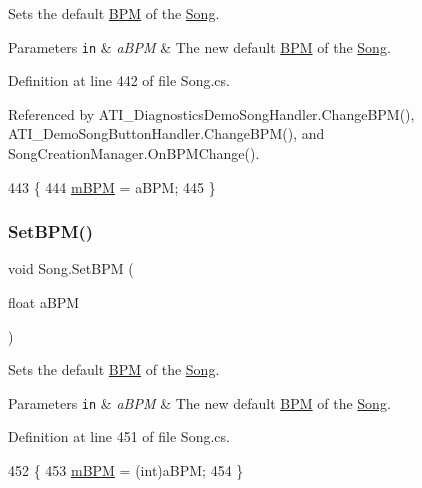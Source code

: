 Sets the default \hyperlink{group___audio_DefBPM}{B\+PM} of the \hyperlink{class_song}{Song}. 


\begin{DoxyParams}[1]{Parameters}
\mbox{\tt in}  & {\em a\+B\+PM} & The new default \hyperlink{group___audio_DefBPM}{B\+PM} of the \hyperlink{class_song}{Song}. \\
\hline
\end{DoxyParams}


Definition at line 442 of file Song.\+cs.



Referenced by A\+T\+I\+\_\+\+Diagnostics\+Demo\+Song\+Handler.\+Change\+B\+P\+M(), A\+T\+I\+\_\+\+Demo\+Song\+Button\+Handler.\+Change\+B\+P\+M(), and Song\+Creation\+Manager.\+On\+B\+P\+M\+Change().


\begin{DoxyCode}
443     \{
444         \hyperlink{group___song_priv_var_ga3341fbbd9c0c58fe6514623e6b6c5a1e}{mBPM} = aBPM;
445     \}
\end{DoxyCode}
\mbox{\label{group___song_pub_func_ga1efefe19fd0c5962f7f8ed16c65cd835}} 
\subsubsection{\texorpdfstring{Set\+B\+P\+M()}{SetBPM()}\hspace{0.1cm}{\footnotesize\ttfamily [2/2]}}
{\footnotesize\ttfamily void Song.\+Set\+B\+PM (\begin{DoxyParamCaption}\item[{float}]{a\+B\+PM }\end{DoxyParamCaption})}



Sets the default \hyperlink{group___audio_DefBPM}{B\+PM} of the \hyperlink{class_song}{Song}. 


\begin{DoxyParams}[1]{Parameters}
\mbox{\tt in}  & {\em a\+B\+PM} & The new default \hyperlink{group___audio_DefBPM}{B\+PM} of the \hyperlink{class_song}{Song}. \\
\hline
\end{DoxyParams}


Definition at line 451 of file Song.\+cs.


\begin{DoxyCode}
452     \{
453         \hyperlink{group___song_priv_var_ga3341fbbd9c0c58fe6514623e6b6c5a1e}{mBPM} = (int)aBPM;
454     \}
\end{DoxyCode}
\mbox{\label{group___song_pub_func_gacb01510cf72657fc7c64bb6ba00c2c56}} 
